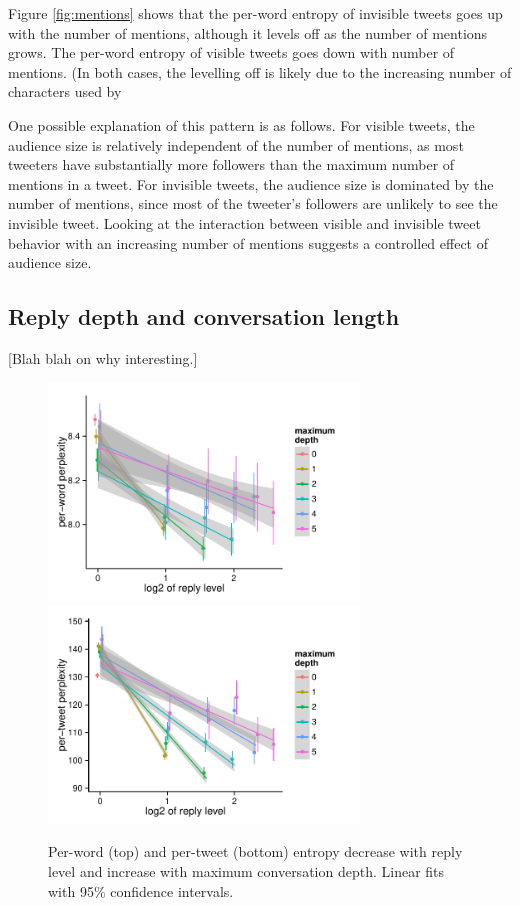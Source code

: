 \documentclass[11pt,letterpaper]{article}
\begin{document}
Figure \ref{fig:mentions} shows that the per-word entropy of invisible tweets goes up with the number of mentions, although it levels off as the number of mentions grows.  The per-word entropy of visible tweets goes down with number of mentions.  (In both cases, the levelling off is likely due to the increasing number of characters used by 

One possible explanation of this pattern is as follows. For visible tweets, the audience size is relatively independent of the number of mentions, as most tweeters have substantially more followers than the maximum number of mentions in a tweet.  For invisible tweets, the audience size is dominated by the number of mentions, since most of the tweeter's followers are unlikely to see the invisible tweet.  Looking at the interaction between visible and invisible tweet behavior with an increasing number of mentions suggests a controlled effect of audience size.

\subsection{Reply depth and conversation length}
[Blah blah on why interesting.]

\begin{figure}[t]
 \centering
  \includegraphics[width=3.25in]{figures/cmcl-rlevel-pw.pdf}
  \includegraphics[width=3.25in]{figures/cmcl-rlevel-pt.pdf}
 \caption{Per-word (top) and per-tweet (bottom) entropy decrease with reply level and increase with maximum conversation depth. Linear fits with 95\% confidence intervals.}\label{fig:rlevel-maxdesc}\vspace*{-.5em}
\end{figure}
\end{document}
